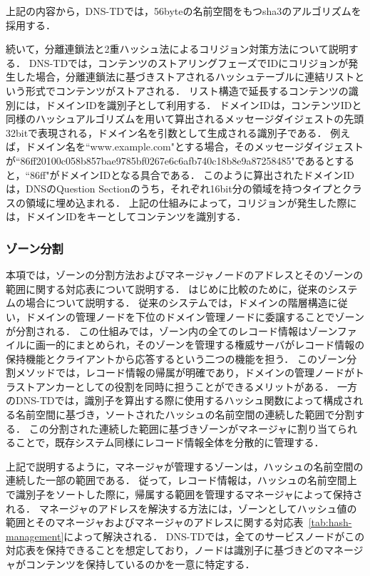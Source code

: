 
上記の内容から，DNS-TDでは，56byteの名前空間をもつsha3のアルゴリズムを採用する．

続いて，分離連鎖法と2重ハッシュ法によるコリジョン対策方法について説明する．
DNS-TDでは，コンテンツのストアリングフェーズでIDにコリジョンが発生した場合，分離連鎖法に基づきストアされるハッシュテーブルに連結リストという形式でコンテンツがストアされる．
リスト構造で延長するコンテンツの識別には，ドメインIDを識別子として利用する．
ドメインIDは，コンテンツIDと同様のハッシュアルゴリズムを用いて算出されるメッセージダイジェストの先頭32bitで表現される，ドメイン名を引数として生成される識別子である．
例えば，ドメイン名を``www.example.com"とする場合，そのメッセージダイジェストが``86ff20100c058b857bae9785bf0267e6c6afb740c18b8e9a87258485"であるとすると，``86ff"がドメインIDとなる具合である．
このように算出されたドメインIDは，DNSのQuestion Sectionのうち，それぞれ16bit分の領域を持つタイプとクラスの領域に埋め込まれる．
上記の仕組みによって，コリジョンが発生した際には，ドメインIDをキーとしてコンテンツを識別する．


\subsubsection{ゾーン分割}
本項では，ゾーンの分割方法およびマネージャノードのアドレスとそのゾーンの範囲に関する対応表について説明する．
はじめに比較のために，従来のシステムの場合について説明する．
従来のシステムでは，ドメインの階層構造に従い，ドメインの管理ノードを下位のドメイン管理ノードに委譲することでゾーンが分割される．
この仕組みでは，ゾーン内の全てのレコード情報はゾーンファイルに画一的にまとめられ，そのゾーンを管理する権威サーバがレコード情報の保持機能とクライアントから応答するという二つの機能を担う．
このゾーン分割メソッドでは，レコード情報の帰属が明確であり，ドメインの管理ノードがトラストアンカーとしての役割を同時に担うことができるメリットがある．
一方のDNS-TDでは，識別子を算出する際に使用するハッシュ関数によって構成される名前空間に基づき，ソートされたハッシュの名前空間の連続した範囲で分割する．
この分割された連続した範囲に基づきゾーンがマネージャに割り当てられることで，既存システム同様にレコード情報全体を分散的に管理する．

上記で説明するように，マネージャが管理するゾーンは，ハッシュの名前空間の連続した一部の範囲である．
従って，レコード情報は，ハッシュの名前空間上で識別子をソートした際に，帰属する範囲を管理するマネージャによって保持される．
マネージャのアドレスを解決する方法には，ゾーンとしてハッシュ値の範囲とそのマネージャおよびマネージャのアドレスに関する対応表~\ref{tab:hash-management}によって解決される．
DNS-TDでは，全てのサービスノードがこの対応表を保持できることを想定しており，ノードは識別子に基づきどのマネージャがコンテンツを保持しているのかを一意に特定する．



